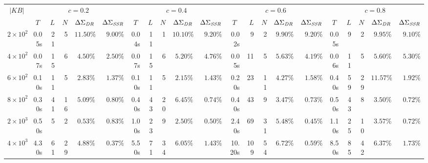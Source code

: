 \documentclass{ecai}
\begin{document}
\begin{table}
\renewcommand{\arraystretch}{1.0}
  \setlength{\tabcolsep}{3pt}
   \centering
 \resizebox{2.0\columnwidth}{!} {%
  \begin{tabular}{|c||rrrrr|rrrrr|rrrrr|rrrrr|}
  \hline
   \multirow{2}{*}{$|KB|$} & \multicolumn{5}{c|}{$c = 0.2$} & \multicolumn{5}{c|}{$c=0.4$} & \multicolumn{5}{c|}{$c=0.6$} & \multicolumn{5}{c|}{$c=0.8$} \\
    \multicolumn{1}{|c||}{} & \multicolumn{1}{c}{$T$} & $L$ & $N$ & \multicolumn{1}{c}{$\Delta \Sigma_{\text{\emph{DR}}}$} & \multicolumn{1}{c|}{$\Delta \Sigma_{\text{\emph{SSR}}}$} & \multicolumn{1}{c}{$T$} & $L$ & $N$ & \multicolumn{1}{c}{$\Delta \Sigma_{\text{\emph{DR}}}$} & \multicolumn{1}{c|}{$\Delta \Sigma_{\text{\emph{SSR}}}$} & \multicolumn{1}{c}{$T$} & $L$ & $N$ & \multicolumn{1}{c}{$\Delta \Sigma_{\text{\emph{DR}}}$} & \multicolumn{1}{c|}{$\Delta \Sigma_{\text{\emph{SSR}}}$} & \multicolumn{1}{c}{$T$} & $L$ & $N$ & \multicolumn{1}{c}{$\Delta \Sigma_{\text{\emph{DR}}}$} & \multicolumn{1}{c|}{$\Delta \Sigma_{\text{\emph{SSR}}}$}  \\
  \hline
  \hline
  $2 \times 10^2$ & 0.05s & 21 & 5 & $11.50\%$ &$9.00\%$ & 0.04s & 11 & 1 &  $10.10\%$ &$9.20\%$ & 0.02s & 9 & 2 & $9.90\%$ &$9.20\%$ & 0.05s & 9 & 2 & $9.95\%$ &$9.10\%$  \\
  
  $4 \times 10^2$ & 0.07s & 15 & 6 & $4.50\%$ &$2.50\%$ &0.07s & 15 & 6 & $5.20\%$ &$4.76\%$ & 0.05s & 11 & 5 & $5.63\%$ &$4.19\%$ & 0.06s & 11 & 5 & $5.60\%$ &$5.30\%$ \\
  
  $6 \times 10^2$ & 0.10s & 11 & 5 & $2.83\%$ &$1.37\%$ & 0.10s & 11& 5& $2.15\%$ &$1.43\%$ & 0.20s & 23  & 11 & $4.27\%$ &$1.58\%$ & 0.40s & 59 & 29 & $11.57\%$ &$1.92\%$  \\
  
  $8 \times 10^2$ & 0.30s & 41& 16 & $5.09\%$ &$0.80\%$ & 0.40s & 43 & 20 & $6.45\%$ &$0.74\%$ & 0.40s & 43 & 9 & $3.47\%$ &$0.73\%$ & 0.50s & 43 & 8 & $3.50\%$ &$0.72\%$ \\
\hline 
\hline
$2 \times 10^3$ &  0.50s & 5 & 2 & $0.53\%$ &$0.83\%$ & 1.00s & 23 & 9 & $2.50\%$ &$0.50\%$ & 2.40s&  69& 31 & $5.48\%$ &$0.45\%$ & 1.10s & 25 & 10 & $3.57\%$ &$0.72\%$  \\
  
  $4 \times 10^3$ & 4.30s & 61 & 29 & $4.88\%$ &$0.37\%$ & 5.50s & 71 & 34 & $6.05\%$ &$1.43\%$ & 10.20s & 109 & 54 & $6.72\%$ &$0.59\%$ & 8.50s & 85 & 42 &$6.37\%$ &$1.73\%$     \\
  

\end{tabular}}
\end{table}
\end{document}
